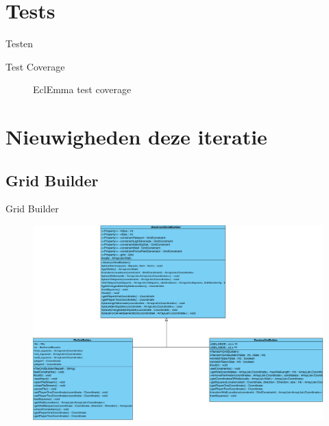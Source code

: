 \documentclass[t]{beamer}
\begin{document}
\section{Tests}

\begin{frame}{Testen}
\begin{multicols}{2}
\tableofcontents[currentsection]
\end{multicols}
\end{frame}

\begin{frame}{Test Coverage}
\begin{figure}[h!]
	\center
	\caption{EclEmma test coverage}
\end{figure}
\end{frame}

\section{Nieuwigheden deze iteratie}

\subsection{Grid Builder}
\begin{frame}{Grid Builder}
\begin{figure}
	\center
	\includegraphics[width= 0.7\linewidth]{img/gridbuilder.pdf}
\end{figure}
\end{frame}
\end{document}
